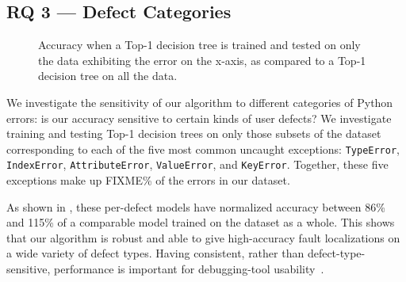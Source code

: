 \documentclass[conference]{IEEEtran}
\newcommand\lt[1]{{\lstinline|#1|}}
\begin{document}





\subsection{RQ 3 --- Defect Categories}

\begin{figure}
\caption{Accuracy when a Top-1 decision tree is trained and tested on only the data exhibiting
the error on the x-axis, as compared to a Top-1 decision tree on all the data.
}
\label{fig-defect-categories}
\end{figure}

We investigate the sensitivity of our algorithm to different categories of
Python errors: is our accuracy sensitive to certain kinds of user defects? 
We investigate training and testing Top-1 decision trees on only those
subsets of the dataset corresponding to each of the five most common
uncaught exceptions: \lt{TypeError}, \lt{IndexError}, \lt{AttributeError},
\lt{ValueError}, and \lt{KeyError}. Together, these five exceptions make
up FIXME\% of the errors in our dataset. 

As shown in , these per-defect models have
normalized accuracy between 86\% and 115\% of a comparable model trained on
the dataset as a whole. This shows that our algorithm is robust and able to
give high-accuracy fault localizations on a wide variety of defect types. 
Having consistent, rather than defect-type-sensitive, performance is
important for debugging-tool
usability~\cite{orso-parnin,Bessey2010,ayewah10}. 
\end{document}
